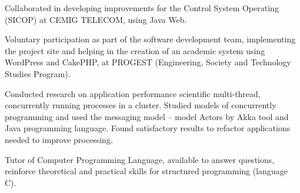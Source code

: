 \documentclass[9pt,a4paper]{altacv}
\begin{document}
\divider


Collaborated in developing improvements for the Control System Operating (SICOP) at CEMIG TELECOM, using Java Web.

\divider


Voluntary participation as part of the software development team, implementing the project site and helping in the creation of an academic system using WordPress and CakePHP, at PROGEST (Engineering, Society and Technology Studies Program).

\divider


Conducted research on application performance scientific multi-thread, concurrently running processes in a cluster. Studied models of concurrently programming and used the messaging model – model Actors by Akka tool and Java programming language. Found satisfactory results to refactor applications needed to improve processing.

\divider


Tutor of Computer Programming Language, available to answer questions, reinforce theoretical and practical skills for structured programming (language C).




\clearpage

\end{document}

